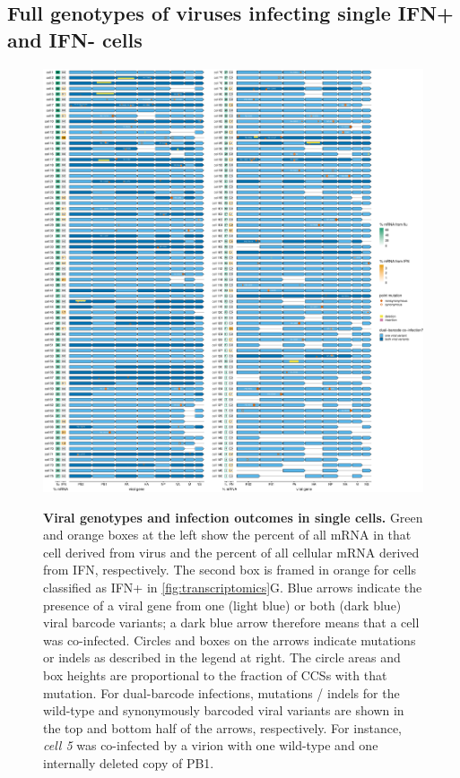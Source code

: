 \documentclass[10pt,letterpaper]{article}
\newenvironment{fullwidth}{%
  \begin{adjustwidth}{-2.05in}{}
}{\end{adjustwidth}}
\newcommand{\FIG}[1]{\autoref{fig:#1}}
\begin{document}
\subsection*{Full genotypes of viruses infecting single IFN+ and IFN- cells}

\begin{figure}
\begin{fullwidth}
{\centering
\includegraphics[height=0.9\textheight]{figures/single_cell_figures/p_genotypes.pdf}
}
\caption{
{\bf Viral genotypes and infection outcomes in single cells.}
Green and orange boxes at the left show the percent of all mRNA in that cell derived from virus and the percent of all cellular mRNA derived from IFN, respectively.
The second box is framed in orange for cells classified as IFN+ in \FIG{transcriptomics}G.
Blue arrows indicate the presence of a viral gene from one (light blue) or both (dark blue) viral barcode variants; a dark blue arrow therefore means that a cell was co-infected.
Circles and boxes on the arrows indicate mutations or indels as described in the legend at right.
The circle areas and box heights are proportional to the fraction of CCSs with that mutation.
For dual-barcode infections, mutations / indels for the wild-type and synonymously barcoded viral variants are shown in the top and bottom half of the arrows, respectively.
For instance, \textit{cell 5} was co-infected by a virion with one wild-type and one internally deleted copy of PB1. 
}
\label{fig:genotypes}

\end{fullwidth}
\end{figure}
\end{document}
